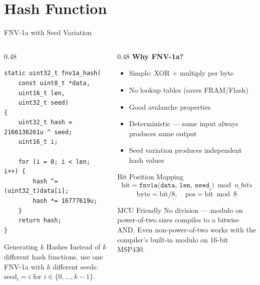 \documentclass[aspectratio=169, 10pt]{beamer}
\begin{document}
\section{Hash Function}

\begin{frame}[fragile]{FNV-1a with Seed Variation}
\begin{columns}[T]
\begin{column}{0.48\textwidth}
\begin{lstlisting}[style=cstyle,
  title={FNV-1a hash --- one function, k seeds}]
static uint32_t fnv1a_hash(
    const uint8_t *data,
    uint16_t len,
    uint32_t seed)
{
    uint32_t hash = 2166136261u ^ seed;
    uint16_t i;

    for (i = 0; i < len; i++) {
        hash ^= (uint32_t)data[i];
        hash *= 16777619u;
    }
    return hash;
}
\end{lstlisting}

\vspace{0.3em}
\begin{block}{Generating $k$ Hashes}
Instead of $k$ different hash functions, use one FNV-1a
with $k$ different seeds: $\text{seed}_i = i$ for
$i \in \{0, \ldots, k{-}1\}$.
\end{block}
\end{column}

\begin{column}{0.48\textwidth}
\textbf{Why FNV-1a?}
\begin{itemize}
  \item Simple: XOR + multiply per byte
  \item No lookup tables (saves FRAM/Flash)
  \item Good avalanche properties
  \item Deterministic --- same input always produces same output
  \item Seed variation produces independent hash values
\end{itemize}

\vspace{0.5em}
\begin{block}{Bit Position Mapping}
\[
  \text{bit} = \texttt{fnv1a(data, len, seed}_i\texttt{)} \bmod n\_bits
\]
\[
  \text{byte} = \text{bit} / 8, \quad \text{pos} = \text{bit} \bmod 8
\]
\end{block}

\vspace{0.3em}
\begin{alertblock}{MCU Friendly}
No division --- modulo on power-of-two sizes compiles to a
bitwise AND. Even non-power-of-two works with the compiler's
built-in modulo on 16-bit MSP430.
\end{alertblock}
\end{column}
\end{columns}
\end{frame}
\end{document}
